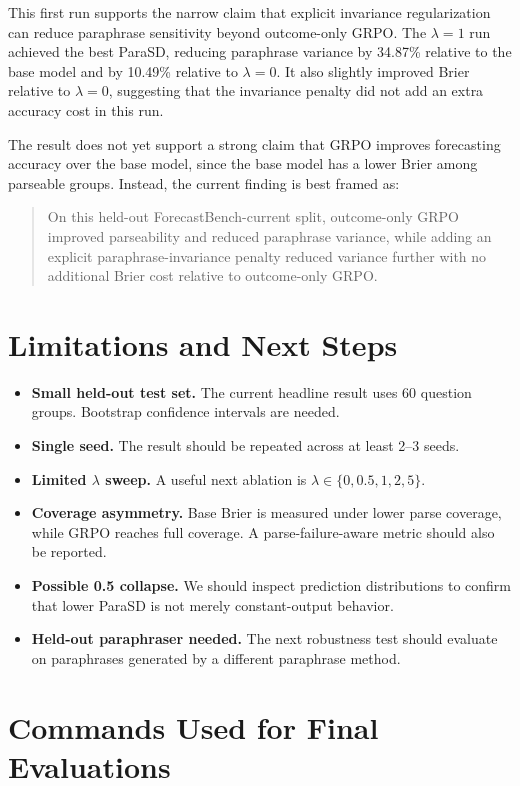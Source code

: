 \documentclass[11pt]{article}
\begin{document}
This first run supports the narrow claim that explicit invariance regularization
can reduce paraphrase sensitivity beyond outcome-only GRPO. The $\lambda=1$ run
achieved the best ParaSD, reducing paraphrase variance by 34.87\% relative to the
base model and by 10.49\% relative to $\lambda=0$. It also slightly improved
Brier relative to $\lambda=0$, suggesting that the invariance penalty did not add
an extra accuracy cost in this run.

The result does not yet support a strong claim that GRPO improves forecasting
accuracy over the base model, since the base model has a lower Brier among
parseable groups. Instead, the current finding is best framed as:

\begin{quote}
On this held-out ForecastBench-current split, outcome-only GRPO improved
parseability and reduced paraphrase variance, while adding an explicit
paraphrase-invariance penalty reduced variance further with no additional Brier
cost relative to outcome-only GRPO.
\end{quote}

\section*{Limitations and Next Steps}

\begin{itemize}[leftmargin=*]
  \item \textbf{Small held-out test set.} The current headline result uses 60 question groups. Bootstrap confidence intervals are needed.
  \item \textbf{Single seed.} The result should be repeated across at least 2--3 seeds.
  \item \textbf{Limited $\lambda$ sweep.} A useful next ablation is $\lambda \in \{0, 0.5, 1, 2, 5\}$.
  \item \textbf{Coverage asymmetry.} Base Brier is measured under lower parse coverage, while GRPO reaches full coverage. A parse-failure-aware metric should also be reported.
  \item \textbf{Possible 0.5 collapse.} We should inspect prediction distributions to confirm that lower ParaSD is not merely constant-output behavior.
  \item \textbf{Held-out paraphraser needed.} The next robustness test should evaluate on paraphrases generated by a different paraphrase method.
\end{itemize}

\section*{Commands Used for Final Evaluations}
\end{document}
